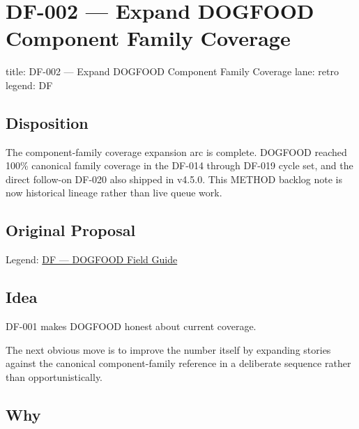 \chapter{DF-002 --- Expand DOGFOOD Component Family Coverage}\label{record-293}

\smallskip

\begin{RecordMeta}
title: DF-002 — Expand DOGFOOD Component Family Coverage
lane: retro
legend: DF

\end{RecordMeta}

\section{Disposition}\label{record-293-disposition}

The component-family coverage expansion arc is complete. DOGFOOD reached 100\% canonical family coverage in the DF-014 through DF-019 cycle set, and the direct follow-on DF-020 also shipped in v4.5.0. This METHOD backlog note is now historical lineage rather than live queue work.

\section{Original Proposal}\label{record-293-original-proposal}

Legend: \href{https://github.com/flyingrobots/bijou/blob/1853ad902f6bf219326409e7f743a5a1d6517dbc/docs/method/legends/DF-dogfood-field-guide.md}{DF --- DOGFOOD Field Guide}

\section{Idea}\label{record-293-idea}

DF-001 makes DOGFOOD honest about current coverage.

The next obvious move is to improve the number itself by expanding stories against the canonical component-family reference in a deliberate sequence rather than opportunistically.

\section{Why}\label{record-293-why}

